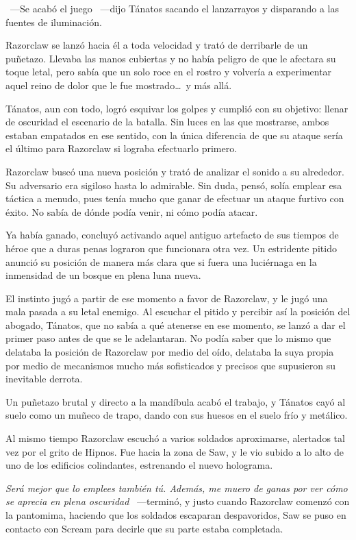 ~---Se acabó el juego ~---dijo Tánatos sacando el lanzarrayos y disparando a las fuentes de iluminación.

Razorclaw se lanzó hacia él a toda velocidad y trató de derribarle de un puñetazo. Llevaba las manos cubiertas y no había peligro de que le afectara su toque letal, pero sabía que un solo roce en el rostro y volvería a experimentar aquel reino de dolor que le fue mostrado\dots\ y más allá.

Tánatos, aun con todo, logró esquivar los golpes y cumplió con su objetivo: llenar de oscuridad el escenario de la batalla. Sin luces en las que mostrarse, ambos estaban empatados en ese sentido, con la única diferencia de que su ataque sería el último para Razorclaw si lograba efectuarlo primero.

Razorclaw buscó una nueva posición y trató de analizar el sonido a su alrededor. Su adversario era sigiloso hasta lo admirable. Sin duda, pensó, solía emplear esa táctica a menudo, pues tenía mucho que ganar de efectuar un ataque furtivo con éxito. No sabía de dónde podía venir, ni cómo podía atacar.

Ya había ganado, concluyó activando aquel antiguo artefacto de sus tiempos de héroe que a duras penas lograron que funcionara otra vez. Un estridente pitido anunció su posición de manera más clara que si fuera una luciérnaga en la inmensidad de un bosque en plena luna nueva.

El instinto jugó a partir de ese momento a favor de Razorclaw, y le jugó una mala pasada a su letal enemigo. Al escuchar el pitido y percibir así la posición del abogado, Tánatos, que no sabía a qué atenerse en ese momento, se lanzó a dar el primer paso antes de que se le adelantaran. No podía saber que lo mismo que delataba la posición de Razorclaw por medio del oído, delataba la suya propia por medio de mecanismos mucho más sofisticados y precisos que supusieron su inevitable derrota.

Un puñetazo brutal y directo a la mandíbula acabó el trabajo, y Tánatos cayó al suelo como un muñeco de trapo, dando con sus huesos en el suelo frío y metálico.

Al mismo tiempo Razorclaw escuchó a varios soldados aproximarse, alertados tal vez por el grito de Hipnos. Fue hacia la zona de Saw, y le vio subido a lo alto de uno de los edificios colindantes, estrenando el nuevo holograma.

\emph{Será mejor que lo emplees también tú. Además, me muero de ganas por ver cómo se aprecia en plena oscuridad} ~---terminó, y justo cuando Razorclaw comenzó con la pantomima, haciendo que los soldados escaparan despavoridos, Saw se puso en contacto con Scream para decirle que su parte estaba completada.

